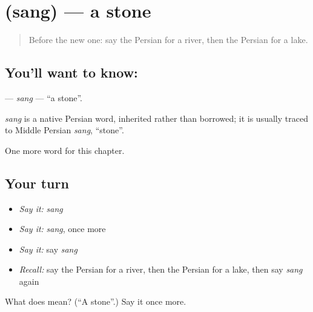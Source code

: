 \section[\texorpdfstring{\fa{سنگ} (sang)}{سنگ (sang)}]{ (sang) — a stone}

\label{lesson:FA-C52-sang}



\begin{quote}
Before the new one: say the Persian for a river, then the Persian for a lake.
\end{quote}

\subsection*{You'll want to know: }
\textbf{} — \emph{sang} — \textquotedblleft{}a stone\textquotedblright{}.

\begin{cousinweb}
\emph{sang} is a native Persian word, inherited rather than borrowed; it is usually traced to Middle Persian \emph{sang}, \textquotedblleft{}stone\textquotedblright{}.
\end{cousinweb}

\begin{grammarlens}[title={What you've built}]
One more word for this chapter.
\end{grammarlens}

\subsection*{Your turn}
\begin{itemize}
\raggedright
  \item \emph{Say it:} \emph{sang}
  \item \emph{Say it:} \emph{sang}, once more
  \item \emph{Say it:} say \emph{sang}
  \item \emph{Recall:} say the Persian for a river, then the Persian for a lake, then say \emph{sang} again
\end{itemize}

\begin{tcolorbox}[breakable,colback=teal!4,colframe=teal!35!black,title={Before you move on}]
What does  mean? (\textquotedblleft{}A stone\textquotedblright{}.) Say it once more.
\end{tcolorbox}
